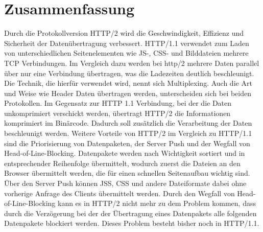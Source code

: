 \documentclass[a4paper, justified, notoc]{tufte-handout} %
\begin{document}
\section{Zusammenfassung} %
\label{sec:zusammenfassung}
Durch die Protokollversion HTTP/2 wird die Geschwindigkeit, Effizienz und Sicherheit der Datenübertragung verbessert. HTTP/1.1 verwendet zum Laden von unterschiedlichen Seitenelementen wie JS-, CSS- und Bilddateien mehrere TCP Verbindungen. Im Vergleich dazu werden bei http/2 mehrere Daten parallel über nur eine Verbindung übertragen, was die Ladezeiten deutlich beschleunigt. Die Technik, die hierfür verwendet wird, nennt sich Multiplexing. Auch die Art und Weise wie Header Daten übertragen werden, unterscheiden sich bei beiden Protokollen. Im Gegensatz zur HTTP 1.1 Verbindung, bei der die Daten unkomprimiert verschickt werden, übertragt HTTP/2 die Informationen komprimiert im Binärcode. Dadurch soll zusätzlich die Verarbeitung der Daten beschleunigt werden. Weitere Vorteile von HTTP/2 im Vergleich zu HTTP/1.1 sind die Priorisierung von Datenpaketen, der Server Push und der Wegfall von Head-of-Line-Blocking. Datenpakete werden nach Wichtigkeit sortiert und in entsprechender Reihenfolge übermittelt, wodurch zuerst die Dateien an den Browser übermittelt werden, die für einen schnellen Seitenaufbau wichtig sind. Über den Server Push können JSS, CSS und andere Dateiformate dabei ohne vorherige Anfrage des Clients übermittelt werden. Durch den Wegfall von Head-of-Line-Blocking kann es in HTTP/2 nicht mehr zu dem Problem kommen, dass durch die Verzögerung bei der der Übertragung eines Datenpakets alle folgenden Datenpakete blockiert werden. Dieses Problem besteht bisher noch in HTTP/1.1.



\newpage

\end{document}
